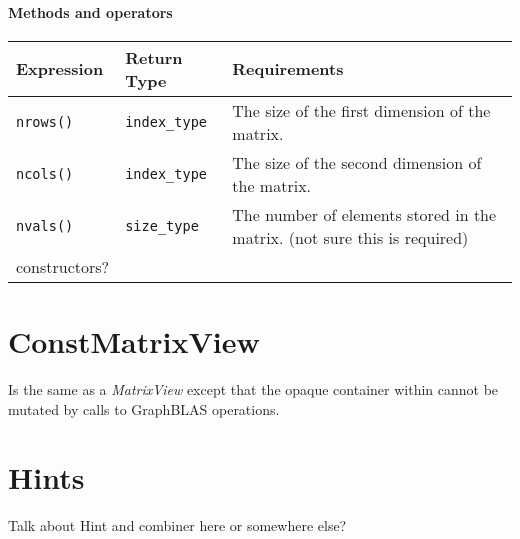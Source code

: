 \paragraph{Methods and operators}

\begin{tabularx}{\textwidth}{l l X}
\textbf{Expression} & \textbf{Return Type} & \textbf{Requirements}\\
\hline
\texttt{nrows()} & \texttt{index\_type} & The size of the first dimension of the matrix.\\ \hline
\texttt{ncols()} & \texttt{index\_type} & The size of the second dimension of the matrix.\\ \hline
\texttt{nvals()} & \texttt{size\_type}  & The number of elements stored in the matrix. (not sure this is required)\\ \hline
constructors? & & \\
\end{tabularx}

\section{ConstMatrixView}

Is the same as a \textit{MatrixView} except that the opaque container within cannot be
mutated by calls to GraphBLAS operations.

\section{Hints}

Talk about Hint and combiner here or somewhere else?
